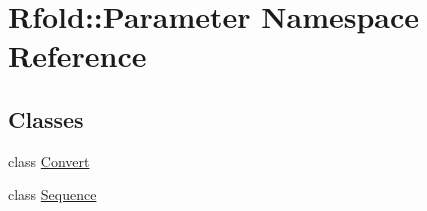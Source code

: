 \hypertarget{namespace_rfold_1_1_parameter}{\section{Rfold\+:\+:Parameter Namespace Reference}
\label{namespace_rfold_1_1_parameter}
}
\subsection*{Classes}
\begin{DoxyCompactItemize}
\item 
class \hyperlink{class_rfold_1_1_parameter_1_1_convert}{Convert}
\item 
class \hyperlink{class_rfold_1_1_parameter_1_1_sequence}{Sequence}
\end{DoxyCompactItemize}
